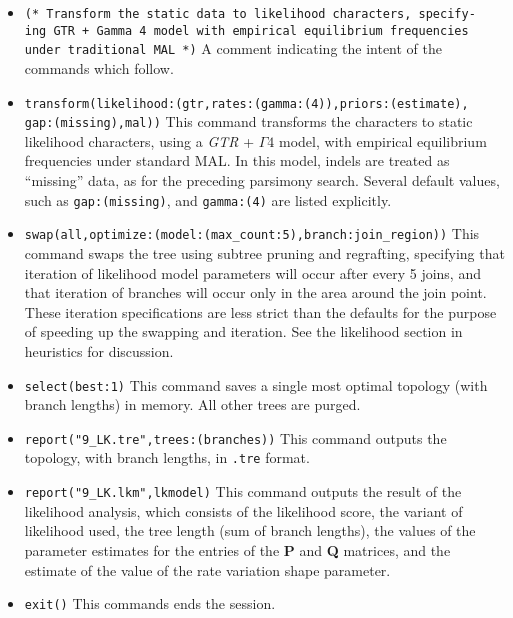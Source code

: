 \begin{itemize}
\item \texttt{(* Transform the static data to likelihood characters, specify-\\ing GTR + Gamma 4 model with empirical 
equilibrium frequencies\\ under traditional MAL *)} A comment indicating the intent of the commands 
which follow.
\item \texttt{transform(likelihood:(gtr,rates:(gamma:(4)),priors:(estimate),\\gap:(missing),mal))} This command 
transforms the characters to static likelihood characters, using a \emph{GTR} + $\Gamma 4$ model, with empirical 
equilibrium frequencies under standard MAL. In this model, indels are treated as ``missing'' data, as for the 
preceding parsimony search. Several default values, such as \texttt{gap:(missing)}, and \texttt{gamma:(4)} are 
listed explicitly.
\item \texttt{swap(all,optimize:(model:(max\_count:5),branch:join\_region))} This command swaps the tree using 
subtree pruning and regrafting, specifying that iteration of likelihood model parameters will occur after every 5 
joins, and that iteration of branches will occur only in the area around the join point. These iteration 
specifications are less strict than the defaults for the purpose of speeding up the swapping and iteration. See the
likelihood section in heuristics for discussion. 
\item \texttt{select(best:1)} This command saves a single most optimal topology (with branch lengths) in 
memory. All other trees are purged.
\item \texttt{report("9\_LK.tre",trees:(branches))} This command outputs the topology, with branch lengths, in 
\texttt{.tre} format.
\item \texttt{report("9\_LK.lkm",lkmodel)} This command outputs the result of the likelihood analysis, which 
consists of the likelihood score, the variant of likelihood used, the tree length (sum of branch lengths), the values 
of the parameter estimates for the entries of the \textbf{P} and \textbf{Q} matrices, and the estimate of the value of 
the rate variation shape parameter.
\item \texttt{exit()} This commands ends the \poy session.
\end{itemize}


